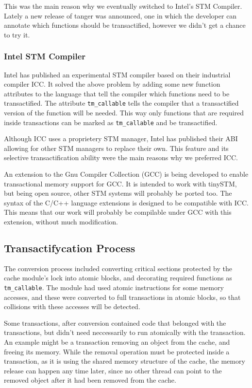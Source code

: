\documentclass[preprint,natbib,11pt]{sigplanconf}
\begin{document}
This was the main reason why we eventually switched to Intel's STM Compiler.
Lately a new release of tanger was announced, one in which the developer can
annotate which functions should be transactified, however we didn't get a chance
to try it.

\subsubsection{Intel STM Compiler}
Intel has published\cite{icc} an experimental STM compiler based on their industrial
compiler ICC. It solved the above problem by adding some new function attributes
to the language that tell the compiler which functions need to be transactified.
The attribute {\tt tm\_callable} tells the compiler that a transactified version
of the function will be needed. This way only functions that are required inside
transactions can be marked as {\tt tm\_callable} and be transactified.

Although ICC uses a proprietery STM manager, Intel has published their
ABI\cite{icc:abi} allowing for other STM managers to replace their own. This feature
and its selective transactification ability were the main reasons why we
preferred ICC.

An extension to the Gnu Compiler Collection (GCC) is being developed\cite{gcctm} to
enable transactional memory support for GCC. It is intended to work with
tinySTM, but being open source, other STM systems will probably be ported too.
The syntax of the C/C++ language extensions is designed to be compatible with
ICC. This means that our work will probably be compilable under GCC with this
extension, without much modification.

\subsection{Transactifycation Process} 
The conversion process included
converting critical sections protected by the cache module's lock into atomic
blocks, and decorating required functions as {\tt tm\_callable}. The module had
used atomic instructions for some memory accesses, and these were converted to
full transactions in atomic blocks, so that collisions with these accesses will
be detected.

Some transactions, after conversion contained code that belonged with the
transactions, but didn't need neccessarily to run atomically with the
transaction. An example might be a transaction removing an object from the
cache, and freeing its memory. While the removal operation must be protected
inside a transaction, as it is using the shared memory structure of the cache,
the memory release can happen any time later, since no other thread can point to
the removed object after it had been removed from the cache. 
\end{document}
